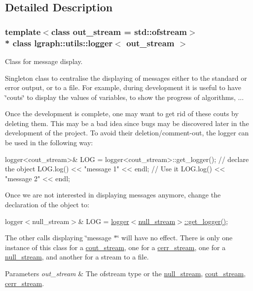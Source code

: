 \subsection{Detailed Description}
\subsubsection*{template$<$class out\+\_\+stream = std\+::ofstream$>$\\*
class lgraph\+::utils\+::logger$<$ out\+\_\+stream $>$}

Class for message display. 

Singleton class to centralise the displaying of messages either to the standard or error output, or to a file. For example, during development it is useful to have \char`\"{}couts\char`\"{} to display the values of variables, to show the progress of algorithms, ...

Once the development is complete, one may want to get rid of these couts by deleting them. This may be a bad idea since bugs may be discovered later in the development of the project. To avoid their deletion/comment-\/out, the logger can be used in the following way\+: \begin{DoxyVerb}logger<cout_stream>& LOG = logger<cout_stream>::get_logger();   // declare the object\n
LOG.log() << "message 1" << endl;   // Use it   \n
LOG.log() << "message 2" << endl;               \n\n
\end{DoxyVerb}


Once we are not interested in displaying messages anymore, change the declaration of the object to\+:

logger$<$null\+\_\+stream$>$\& L\+OG = \hyperlink{classlgraph_1_1utils_1_1logger_af9d53836a2c37c72a08cf14f7e071abb}{logger$<$null\+\_\+stream$>$\+::get\+\_\+logger()};

The other calls displaying \char`\"{}message $\ast$\char`\"{} will have no effect. There is only one instance of this class for a \hyperlink{classlgraph_1_1utils_1_1cout__stream}{cout\+\_\+stream}, one for a \hyperlink{classlgraph_1_1utils_1_1cerr__stream}{cerr\+\_\+stream}, one for a \hyperlink{classlgraph_1_1utils_1_1null__stream}{null\+\_\+stream}, and another for a stream to a file.


\begin{DoxyParams}{Parameters}
{\em out\+\_\+stream} & The ofstream type or the \hyperlink{classlgraph_1_1utils_1_1null__stream}{null\+\_\+stream}, \hyperlink{classlgraph_1_1utils_1_1cout__stream}{cout\+\_\+stream}, \hyperlink{classlgraph_1_1utils_1_1cerr__stream}{cerr\+\_\+stream}. \\
\hline
\end{DoxyParams}


